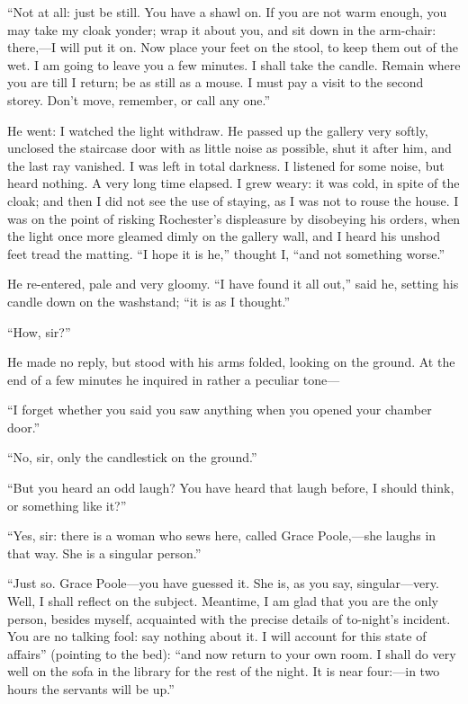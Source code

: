\enquote{Not at all: just be still. You have a shawl on. If you are
	not warm enough, you may take my cloak yonder; wrap it about you, and
	sit down in the arm-chair: there,---I will put it on. Now place your
	feet on the stool, to keep them out of the wet. I am going to leave you
	a few minutes. I shall take the candle. Remain where you are till I
	return; be as still as a mouse. I must pay a visit to the second
	storey. Don't move, remember, or call any one.}

He went: I watched the light withdraw. He passed up the gallery very
softly, unclosed the staircase door with as little noise as possible,
shut it after him, and the last ray vanished. I was left in total
darkness. I listened for some noise, but heard nothing. A very long
time elapsed. I grew weary: it was cold, in spite of the cloak; and
then I did not see the use of staying, as I was not to rouse the house.
I was on the point of risking \Mr{}  Rochester's displeasure by disobeying
his orders, when the light once more gleamed dimly on the gallery wall,
and I heard his unshod feet tread the matting. \enquote{I hope it is
	he,} thought I, \enquote{and not something worse.}

He re-entered, pale and very gloomy. \enquote{I have found it all out,}
said he, setting his candle down on the washstand; \enquote{it is as I
	thought.}

\enquote{How, sir?}

He made no reply, but stood with his arms folded, looking on the
ground. At the end of a few minutes he inquired in rather a peculiar
tone---

\enquote{I forget whether you said you saw anything when you opened your
	chamber door.}

\enquote{No, sir, only the candlestick on the ground.}

\enquote{But you heard an odd laugh? You have heard that laugh before,
	I should think, or something like it?}

\enquote{Yes, sir: there is a woman who sews here, called Grace
	Poole,---she laughs in that way. She is a singular person.}

\enquote{Just so. Grace Poole---you have guessed it. She is, as you
	say, singular---very. Well, I shall reflect on the subject. Meantime,
	I am glad that you are the only person, besides myself, acquainted with
	the precise details of to-night's incident. You are no talking fool:
	say nothing about it. I will account for this state of affairs}
(pointing to the bed): \enquote{and now return to your own room. I
	shall do very well on the sofa in the library for the rest of the
	night. It is near four:---in two hours the servants will be up.}

